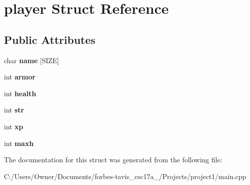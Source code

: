 \hypertarget{structplayer}{}\section{player Struct Reference}
\label{structplayer}
\subsection*{Public Attributes}
\begin{DoxyCompactItemize}
\item 
\hypertarget{structplayer_af44d7cb9748ae809edbeb68a34a282e6}{}char {\bfseries name} \mbox{[}S\+I\+Z\+E\mbox{]}\label{structplayer_af44d7cb9748ae809edbeb68a34a282e6}

\item 
\hypertarget{structplayer_a63c20d062adde3b7b752d1640a36258e}{}int {\bfseries armor}\label{structplayer_a63c20d062adde3b7b752d1640a36258e}

\item 
\hypertarget{structplayer_a46e908a72ca54baf54330861bbc56713}{}int {\bfseries health}\label{structplayer_a46e908a72ca54baf54330861bbc56713}

\item 
\hypertarget{structplayer_a3f5afbd398724555af2babef3175b4f5}{}int {\bfseries str}\label{structplayer_a3f5afbd398724555af2babef3175b4f5}

\item 
\hypertarget{structplayer_a370a68f0051f4990d825e8847d2ddc09}{}int {\bfseries xp}\label{structplayer_a370a68f0051f4990d825e8847d2ddc09}

\item 
\hypertarget{structplayer_a7b5fcdcdf1f304e5e703dfdd4901a5a4}{}int {\bfseries maxh}\label{structplayer_a7b5fcdcdf1f304e5e703dfdd4901a5a4}

\end{DoxyCompactItemize}


The documentation for this struct was generated from the following file\+:\begin{DoxyCompactItemize}
\item 
C\+:/\+Users/\+Owner/\+Documents/forbes-\/tavis\+\_\+csc17a\+\_/\+Projects/project1/main.\+cpp\end{DoxyCompactItemize}
